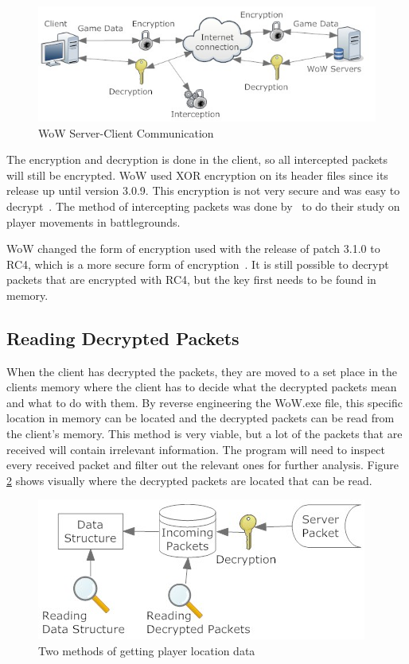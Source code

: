 \begin{figure}[htbp]
\centering
\includegraphics[scale = 0.6]{encrypt.jpg}	
\caption{WoW Server-Client Communication}
\label{encryption}
\end{figure}

The encryption and decryption is done in the client, so all intercepted packets will still be encrypted. WoW used XOR encryption on its header files since its release up until version 3.0.9. This encryption is not very secure and was easy to decrypt~\cite{xor}. The method of intercepting packets was done by~\citet{previous} to do their study on player movements in battlegrounds. 

WoW changed the form of encryption used with the release of patch 3.1.0 to RC4, which is a more secure form of encryption~\cite{rc4}. It is still possible to decrypt packets that are encrypted with RC4, but the key first needs to be found in memory. %

\subsection{Reading Decrypted Packets}
When the client has decrypted the packets, they are moved to a set place in the clients memory where the client has to decide what the decrypted packets mean and what to do with them. By reverse engineering the WoW.exe file, this specific location in memory can be located and the decrypted packets can be read from the client's memory. This method is very viable, but a lot of the packets that are received will contain irrelevant information. The program will need to inspect every received packet and filter out the relevant ones for further analysis. %
Figure \ref{methods} shows visually where the decrypted packets are located that can be read.

\begin{figure}[htbp]
\centering
\includegraphics[scale = 0.65]{methods.jpg}	
\caption{Two methods of getting player location data}
\label{methods}
\end{figure}

